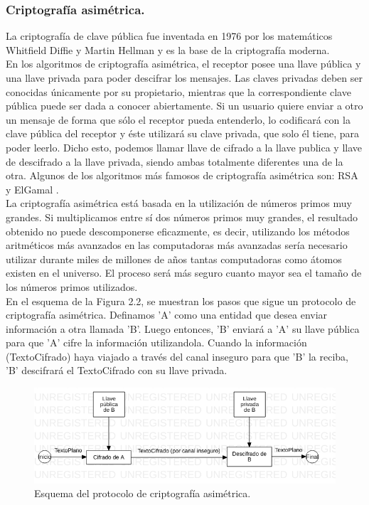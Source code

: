 \documentclass[12pt, a4paper, titlepage]{report}
\begin{document}
        		\subsubsection{Criptografía asimétrica.}
        		La  criptografía  de  clave  pública  fue  inventada  en 1976  por  los  matemáticos  Whitfield Diffie y Martin Hellman y es la base de la criptografía moderna. \\
        		En los algoritmos de criptografía asimétrica, el receptor posee una llave pública y una llave privada para poder descifrar los mensajes. Las claves privadas deben ser conocidas únicamente por su propietario, mientras que la correspondiente clave pública puede ser dada a conocer abiertamente. Si un usuario quiere enviar a otro un mensaje de forma que sólo el receptor pueda entenderlo, lo codificará con la clave pública del receptor y éste utilizará su clave privada, que solo él tiene, para poder leerlo. Dicho esto, podemos llamar llave de cifrado a la llave publica y llave de descifrado a la llave privada, siendo ambas totalmente diferentes una de la otra. Algunos de los algoritmos más famosos de criptografía asimétrica son: RSA y ElGamal \cite{refCriptografia}.\\
        		La criptografía asimétrica está basada en la utilización de números primos muy grandes. Si multiplicamos entre sí dos números primos muy grandes, el resultado obtenido no puede descomponerse eficazmente, es decir, utilizando los métodos aritméticos más avanzados en las computadoras más avanzadas sería necesario utilizar durante miles de millones de años tantas computadoras como átomos existen en el universo. El proceso será más seguro cuanto mayor sea el tamaño de los números primos utilizados.\\
        		
        		En el esquema de la Figura 2.2, se muestran los pasos que sigue un protocolo de criptografía asimétrica. Definamos 'A' como una entidad que desea enviar información a otra llamada 'B'. Luego entonces, 'B' enviará a 'A' su llave pública para que 'A' cifre la información utilizandola. Cuando la información (TextoCifrado) haya viajado a través del canal inseguro para que 'B' la reciba, 'B' descifrará el TextoCifrado con su llave privada.
        		
        		\begin{figure}[H]
        			\begin{center}	                  \includegraphics[width=14cm]{./imagenes/MarcoTeorico/cripto_asimetrica.png}
        				\caption{Esquema del protocolo de criptografía asimétrica.}
        			\end{center}
        		\end{figure}
        		
\end{document}
